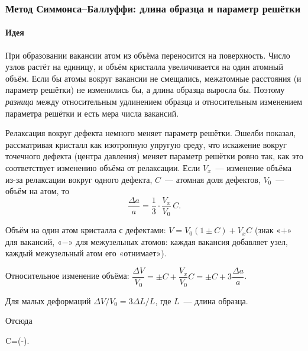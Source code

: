 \subsubsection{Метод Симмонса--Баллуффи: длина образца и параметр решётки}

\paragraph{Идея}
При образовании вакансии атом из объёма переносится на поверхность.
Число узлов растёт на единицу, и объём кристалла увеличивается на один
атомный объём. Если бы атомы вокруг вакансии не смещались, межатомные
расстояния (и параметр решётки) не изменились бы, а длина образца
выросла бы. Поэтому \emph{разница} между относительным удлинением
образца и относительным изменением параметра решётки и есть мера числа
вакансий.

Релаксация вокруг дефекта немного меняет параметр решётки. Эшелби
показал, рассматривая кристалл как изотропную упругую среду, что
искажение вокруг точечного дефекта (центра давления) меняет параметр
решётки ровно так, как это соответствует изменению объёма от релаксации.
Если $V_x$~— изменение объёма из-за релаксации вокруг одного дефекта,
$C$~— атомная доля дефектов, $V_0$~— объём на атом, то
\[
\frac{\Delta a}{a}=\frac13\cdot\frac{V_x}{V_0}\,C .
\]

\begin{shagi}
\item Объём на один атом кристалла с дефектами:
$V=V_0(1\pm C)+V_xC$ (знак «$+$» для вакансий, «$-$» для межузельных
атомов: каждая вакансия добавляет узел, каждый межузельный атом его
«отнимает»).
\item Относительное изменение объёма:
$\dfrac{\Delta V}{V_0}=\pm C+\dfrac{V_x}{V_0}C=\pm C+3\dfrac{\Delta a}{a}$.
\item Для малых деформаций $\Delta V/V_0=3\Delta L/L$, где $L$~— длина
образца.
\end{shagi}
Отсюда
\begin{keyeq}\label{eq:simmons}
C=\left(-\right).
\end{keyeq}

